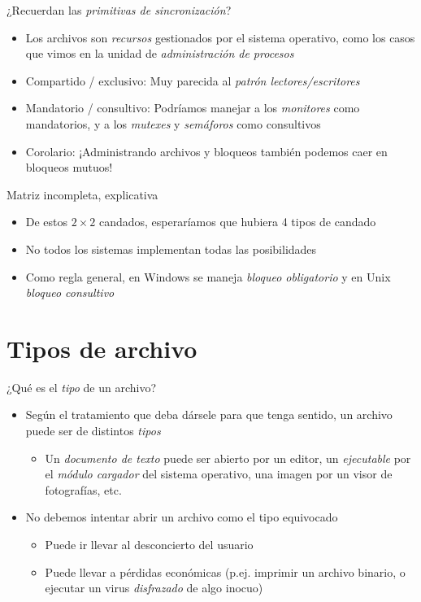\documentclass[presentation]{beamer}
\begin{document}
\begin{frame}[label={sec:org2b6d61c}]{¿Recuerdan las \emph{primitivas de sincronización}?}
\begin{itemize}
\item Los archivos son \emph{recursos} gestionados por el sistema operativo,
como los casos que vimos en la unidad de \emph{administración de
procesos}
\item Compartido / exclusivo: Muy parecida al \emph{patrón lectores/escritores}
\item Mandatorio / consultivo: Podríamos manejar a los \emph{monitores} como
mandatorios, y a los \emph{mutexes} y \emph{semáforos} como consultivos
\item Corolario: ¡Administrando archivos y bloqueos también podemos caer
en bloqueos mutuos!
\end{itemize}
\end{frame}

\begin{frame}[label={sec:org79d9bd9}]{Matriz incompleta, explicativa}
\begin{itemize}
\item De estos \(2 \times 2\) candados, esperaríamos que hubiera 4 tipos de
candado
\item No todos los sistemas implementan todas las posibilidades
\item Como regla general, en Windows se maneja \emph{bloqueo obligatorio} y en
Unix \emph{bloqueo consultivo}
\end{itemize}
\end{frame}

\section{Tipos de archivo}
\label{sec:org0d251cb}

\begin{frame}[label={sec:org9c0eee2}]{¿Qué es el \emph{tipo} de un archivo?}
\begin{itemize}
\item Según el tratamiento que deba dársele para que tenga sentido, un
archivo puede ser de distintos \emph{tipos}
\begin{itemize}
\item Un \emph{documento de texto} puede ser abierto por un editor, un
\emph{ejecutable} por el \emph{módulo cargador} del sistema operativo, una
imagen por un visor de fotografías, etc.
\end{itemize}
\item No debemos intentar abrir un archivo como el tipo equivocado
\begin{itemize}
\item Puede ir llevar al desconcierto del usuario
\item Puede llevar a pérdidas económicas (p.ej. imprimir un archivo
binario, o ejecutar un virus \emph{disfrazado} de algo inocuo)
\end{itemize}
\end{itemize}
\end{frame}
\end{document}
